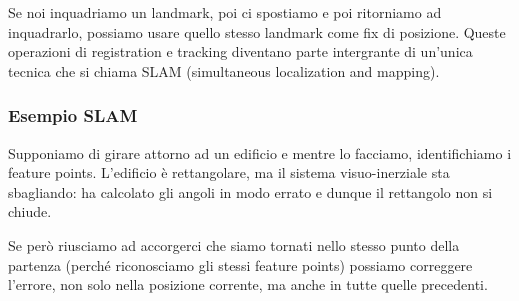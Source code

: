Se noi inquadriamo un landmark, poi ci spostiamo e poi ritorniamo ad inquadrarlo, possiamo usare quello stesso landmark come fix di posizione.
Queste operazioni di registration e tracking diventano parte intergrante di un'unica tecnica che si chiama SLAM (simultaneous localization and mapping). 

\subsubsection{Esempio SLAM}
Supponiamo di girare attorno ad un edificio e mentre lo facciamo, identifichiamo i feature points. L'edificio è rettangolare, ma il sistema visuo-inerziale sta sbagliando: ha calcolato gli angoli in modo errato e dunque il rettangolo non si chiude.

Se però riusciamo ad accorgerci che siamo tornati nello stesso punto della partenza (perché riconosciamo gli stessi feature points) possiamo correggere l'errore, non solo nella posizione corrente, ma anche in tutte quelle precedenti.

\begin{figure}[!ht]
\begin{center}
    \qquad {}
\end{center}

\end{figure}
